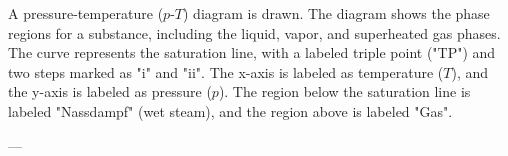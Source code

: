 A pressure-temperature (\(p\)-\(T\)) diagram is drawn. The diagram shows the phase regions for a substance, including the liquid, vapor, and superheated gas phases. The curve represents the saturation line, with a labeled triple point ("TP") and two steps marked as "i" and "ii". The x-axis is labeled as temperature (\(T\)), and the y-axis is labeled as pressure (\(p\)). The region below the saturation line is labeled "Nassdampf" (wet steam), and the region above is labeled "Gas".

---
